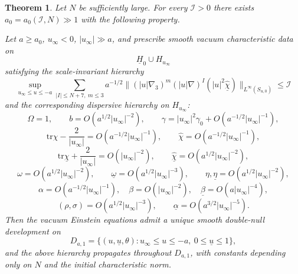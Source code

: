 \documentclass{amsart}
\newtheorem{theorem}{Theorem}[section]
\newcommand{\Hbar}{\underline{H}}
\newcommand{\ubar}{\underline{u}}
\newcommand{\tr}{\mbox{tr}}
\begin{document}




\begin{theorem}
\label{main1}
Let \(N\) be sufficiently large.  For every \(\mathcal I>0\) there exists
\(a_{0}=a_{0}(\mathcal I,N)\gg1\) with the following property.

\noindent Let \(a\ge a_{0}\), \(u_{\infty}<0\), \(|u_{\infty}|\gg a\), and prescribe smooth
vacuum characteristic data on
\[
\underline H_{0}\cup H_{u_{\infty}}
\]
satisfying the scale-invariant hierarchy
\[
\sup_{u_{\infty}\le u\le -a}
\sum_{|I|\le N+7,\ m\le 3}
a^{-1/2}
\bigl\|
(|u|\nabla_{3})^{m}(|u|\nabla)^{I}
(|u|^{2}\underline{\hat\chi})
\bigr\|_{L^{\infty}(S_{u,0})}
\le \mathcal I
\]
and the corresponding dispersive hierarchy on \(H_{u_{\infty}}\):
\[
\Omega=1,\qquad
b=O(a^{1/2}|u_{\infty}|^{-2}),\qquad
\gamma=|u_{\infty}|^{2}\gamma_{0}
+O(a^{-1/2}|u_{\infty}|^{-1}),
\]
\[
\tr\chi-\frac{2}{|u_{\infty}|}
=O(a^{-1/2}|u_{\infty}|^{-1}),\qquad
\hat\chi=O(a^{-1/2}|u_{\infty}|^{-1}),
\]
\[
\tr\underline\chi+\frac{2}{|u_{\infty}|}
=O(|u_{\infty}|^{-2}),\qquad
\underline{\hat\chi}=O(a^{1/2}|u_{\infty}|^{-2}),
\]
\[
\omega=O(a^{1/2}|u_{\infty}|^{-2}),\qquad
\underline\omega=O(a^{1/2}|u_{\infty}|^{-3}),\qquad
\eta,\underline\eta=O(a^{1/2}|u_{\infty}|^{-2}),
\]
\[
\alpha=O(a^{-1/2}|u_{\infty}|^{-1}),\quad
\beta=O(|u_{\infty}|^{-2}),\quad
\underline\beta=O(a|u_{\infty}|^{-4}),
\]
\[
(\rho,\sigma)=O(a^{1/2}|u_{\infty}|^{-3}),\qquad
\underline\alpha=O(a^{3/2}|u_{\infty}|^{-5}).
\]
Then the vacuum Einstein equations admit a unique smooth double-null development
on
\[
D_{a,1}
=
\{(u,\ubar,\theta)\colon u_{\infty}\le u\le -a,\ 0\le \ubar\le 1\},
\]
and the above hierarchy propagates throughout \(D_{a,1}\), with constants depending
only on \(N\) and the initial characteristic norm.
\end{theorem}
\end{document}
